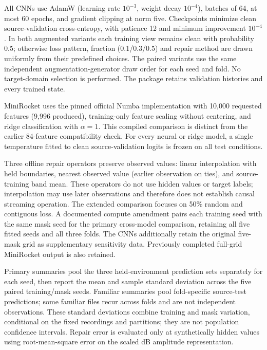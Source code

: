 \documentclass[a4paper,11pt,fleqn]{mira-author}
\begin{document}
All CNNs use AdamW (learning rate $10^{-3}$, weight decay $10^{-4}$), batches of 64, at most 60 epochs, and gradient clipping at norm five. Checkpoints minimize clean source-validation cross-entropy, with patience 12 and minimum improvement $10^{-4}$. In both augmented variants each training view remains clean with probability 0.5; otherwise loss pattern, fraction (0.1/0.3/0.5) and repair method are drawn uniformly from their predefined choices. The paired variants use the same independent augmentation-generator draw order for each seed and fold. No target-domain selection is performed. The package retains validation histories and every trained state.

MiniRocket uses the pinned official Numba implementation with 10,000 requested features (9,996 produced), training-only feature scaling without centering, and ridge classification with $\alpha=1$. This compiled comparison is distinct from the earlier 84-feature compatibility check. For every neural or ridge model, a single temperature fitted to clean source-validation logits is frozen on all test conditions.

Three offline repair operators preserve observed values: linear interpolation with held boundaries, nearest observed value (earlier observation on ties), and source-training band mean. These operators do not use hidden values or target labels; interpolation may use later observations and therefore does not establish causal streaming operation. The extended comparison focuses on 50\% random and contiguous loss. A documented compute amendment pairs each training seed with the same mask seed for the primary cross-model comparison, retaining all five fitted seeds and all three folds. The CNNs additionally retain the original five-mask grid as supplementary sensitivity data. Previously completed full-grid MiniRocket output is also retained.

Primary summaries pool the three held-environment prediction sets separately for each seed, then report the mean and sample standard deviation across the five paired training/mask seeds. Familiar summaries pool fold-specific source-test predictions; some familiar files recur across folds and are not independent observations. These standard deviations combine training and mask variation, conditional on the fixed recordings and partitions; they are not population confidence intervals. Repair error is evaluated only at synthetically hidden values using root-mean-square error on the scaled dB amplitude representation.
\end{document}
